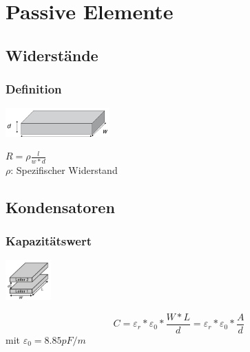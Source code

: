 \section{Passive Elemente}

\subsection{Widerstände}

\subsubsection{Definition}
\begin{multicols}{2}
\includegraphics[width=0.3\textwidth]{pictures/widerstand.png}

\columnbreak

$R=\rho\frac{l}{w*d}$ \\
$\rho$: Spezifischer Widerstand
\end{multicols} 

\subsection{Kondensatoren}
\subsubsection{Kapazitätswert}
\begin{multicols}{2}
	\begin{center}
		\includegraphics[width=0.13\textwidth]{pictures/kapazitaetswert}
	\end{center}
	\columnbreak

	\begin{equation*}
		C=\varepsilon_{r}*\varepsilon_{0}*\frac{W*L}{d}=\varepsilon_{r}*\varepsilon_{0}*\frac{A}{d}
	\end{equation*}
	mit $\varepsilon_{0}= 8.85 pF/m$
\end{multicols}



